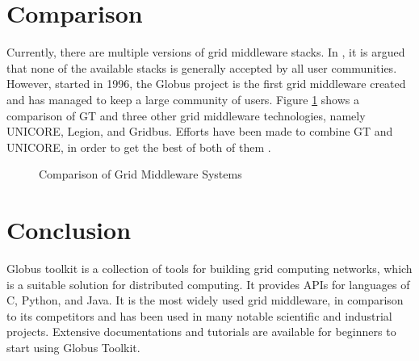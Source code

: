 \documentclass[9pt,twocolumn,twoside]{styles/osajnl}
\begin{document}
\section{Comparison}
Currently, there are multiple versions of grid middleware stacks. In \cite{schwiegelshohn2010perspectives}, it is argued that none of the available stacks is generally accepted
by all user communities. However, started in 1996, the Globus project is the first grid middleware created \cite{www-uchigago} and has managed to keep a large community of users. Figure \ref{fig:comp-table} shows a comparison of GT and three other grid middleware technologies, namely UNICORE, Legion, and Gridbus. Efforts have been made to combine GT and UNICORE, in order to get the best of both of them \cite{rambadt2002unicore}.
\begin{figure}[htbp]
\centering
{}
\caption{Comparison of Grid Middleware Systems \cite{asadzadeh2005global}}
\label{fig:comp-table}
\end{figure}

\section{Conclusion}
Globus toolkit is a collection of tools for building grid computing networks, which is a suitable solution for distributed computing. 
It provides APIs for languages of C, Python, and Java. It is the most widely used grid middleware, in comparison to its competitors 
and has been used in many notable scientific and industrial projects. Extensive documentations and tutorials are available for beginners to start using Globus Toolkit.
\end{document}

